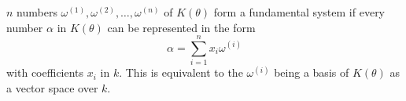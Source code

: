 $n$ numbers $\omega^{(1)}, \omega^{(2)}, \ldots, \omega^{(n)}$ of $K(\theta)$ form a fundamental system if every number $\alpha$ in $K(\theta)$ can be represented in the form
$$\alpha = \sum_{i=1}^{n} x_i \omega^{(i)}$$
with coefficients $x_i$ in $k$. This is equivalent to the $\omega^{(i)}$ being a basis of $K(\theta)$ as a vector space over $k$.
